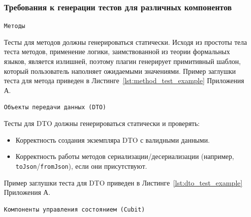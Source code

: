 \documentclass[14pt, russian]{scrartcl}
\begin{document}
\subsubsection{Требования к генерации тестов для различных компонентов}

\texttt{Методы}

Тесты для методов должны генерироваться статически. Исходя из простоты тела теста методов, применение логики, заимствованной из теории формальных языков, является излишней, поэтому плагин генерирует примитивный шаблон, который пользователь наполняет ожидаемыми значениями.
Пример заглушки теста для метода приведен в Листинге~\ref{lst:method_test_example} Приложения А.

\texttt{Объекты передачи данных (DTO)}

Тесты для DTO должны генерироваться статически и проверять:
\begin{itemize}
    \item Корректность создания экземпляра DTO с валидными данными.
    \item Корректность работы методов сериализации/десериализации (например, \texttt{toJson}/\texttt{fromJson}), если они присутствуют.
\end{itemize}
Пример заглушки теста для DTO приведен в Листинге~\ref{lst:dto_test_example} Приложения А.

\texttt{Компоненты управления состоянием (Cubit)}
\end{document}
